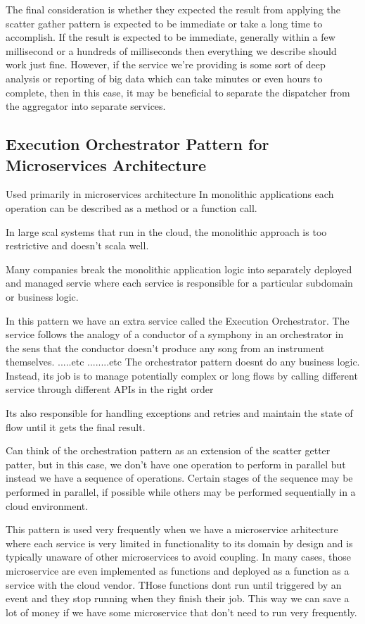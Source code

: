 \documentclass[a4paper, 11pt]{book}
\begin{document}
    The final consideration is whether they expected the result from applying the scatter gather pattern is expected to be immediate or take a long time to accomplish.
    If the result is expected to be immediate, generally within a few millisecond or a hundreds of milliseconds then everything we describe should work just fine.
    However, if the service we're providing is some sort of deep analysis or reporting of big data which can take minutes or even hours to complete, then in this case, it may be beneficial to separate the dispatcher from the aggregator into separate services.

    \subsection{Execution Orchestrator Pattern for Microservices Architecture}
    Used primarily in microservices architecture
    In monolithic applications each operation can be described as a method or a function call.

    In large scal systems that run in the cloud, the monolithic approach is too restrictive and doesn't scala well.

    Many companies break the monolithic application logic into separately deployed and managed servie where each service is responsible for a particular subdomain or business logic.

    In this pattern we have an extra service called the Execution Orchestrator.
    The service follows the analogy of a conductor of a symphony in an orchestrator in the sens that the conductor doesn't produce any song from an instrument themselves.
    .....etc ........etc
    The orchestrator pattern doesnt do any business logic.
    Instead, its job is to manage potentially complex or long flows by calling different service through different APIs in the right order

    Its also responsible for handling exceptions and retries and maintain the state of flow until it gets the final result.

    Can think of the orchestration pattern as an extension of the scatter getter patter, but in this case, we don't have one operation to perform in parallel but instead we have a sequence of operations.
    Certain stages of the sequence may be performed in parallel, if possible while others may be performed sequentially in a cloud environment.

    This pattern is used very frequently when we have a microservice arhitecture where each service is very limited in functionality to its domain by design and is typically unaware of other microservices to avoid coupling.
    In many cases, those microservice are even implemented as functions and deployed as a function as a service with the cloud vendor.
    THose functions dont run until triggered by an event and they stop running when they finish their job.
    This way we can save a lot of money if we have some microservice that don't need to run very frequently.
\end{document}

